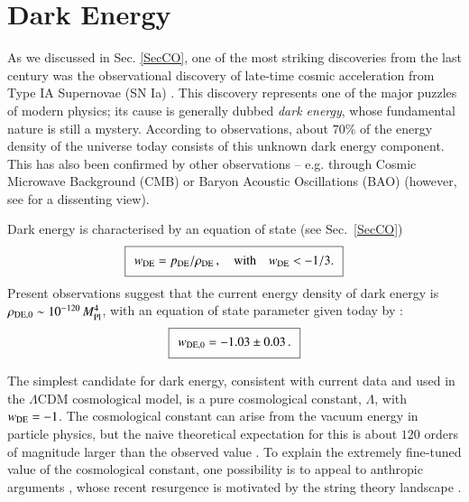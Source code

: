 \startdocument

\section{Dark Energy}
\label{sec:DE}

As we discussed in Sec. \ref{SecCO}, one of the most striking discoveries from the last century was the observational discovery of late-time cosmic acceleration from Type IA Supernovae (SN Ia) \cite{Riess:1998cb,Perlmutter:1998np}. This discovery represents one of the major puzzles of modern physics; its cause is generally dubbed {\em dark energy}, whose fundamental nature is still a mystery. According to observations, about $70\%$ of the energy density of the universe today consists of this unknown dark energy component. This has also been confirmed by other observations -- e.g. through Cosmic Microwave Background (CMB) \cite{WMAP:2003elm,Planck:2018vyg} or Baryon Acoustic Oscillations (BAO) \cite{SDSS:2005xqv} (however, see \cite{Sarkar:2007cx} for a dissenting view). 

Dark energy is characterised by an equation of state (see Sec.~\ref{SecCO})
\begin{equation}
\setlength\fboxsep{0.25cm}
\setlength\fboxrule{0.4pt}
\boxed{
w_{\rm DE} = p_{\rm DE}/\rho_{\rm DE} \,, \quad {\text{with}} \quad w_{\rm DE}< -1/3.
}
\end{equation}
Present observations suggest that the current energy density of dark energy is
$\rho_{{\rm DE}, 0} \sim 10^{-120}\,M_{\rm Pl}^4$, with an equation of state parameter given today by \cite{Planck:2018vyg}:
\begin{equation}
\setlength\fboxsep{0.25cm}
\setlength\fboxrule{0.4pt}
\boxed{
w_{{\rm DE}, 0} = -1.03 \pm 0.03 \,.
}
\end{equation}
 
The simplest candidate for dark energy, consistent with current data and used in the $\Lambda$CDM cosmological model, is a pure cosmological constant, $\Lambda$,  with $w_{\rm DE} =-1$. The cosmological constant can arise from the vacuum energy in particle physics, but the naive theoretical expectation for this is about $120$ orders of magnitude larger than the observed value \cite{Weinberg1}. 
To explain the extremely fine-tuned value of the cosmological constant, one possibility is to appeal to anthropic arguments  \cite{Weinberg2,Garriga:1999bf}, whose recent resurgence is motivated by the string theory landscape \cite{Douglas:2006es}. 

